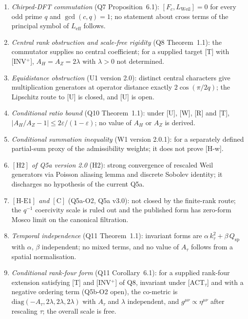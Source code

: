 \documentclass[11pt,a4paper]{article}
\theoremstyle{definition}
\newcommand{\Leff}{L_{\mathrm{eff}}}
\newcommand{\geff}{g^{\mu\nu}}
\newcommand{\Atau}{A_\tau}
\newcommand{\AH}{A_H}
\newcommand{\AZ}{A_Z}
\begin{document}
\begin{enumerate}
        \item \textit{Chirped-DFT commutation} (Q7 Proposition~6.1): $[F_c, L_{\mathrm{Weil}}] = 0$
        for every odd prime $q$ and $\gcd(c, q) = 1$; no statement about cross terms of the
        principal symbol of $\Leff$ follows.

        \item \textit{Central rank obstruction and scale-free rigidity} (Q8 Theorem~1.1): the
        commutator supplies no central coefficient; for a supplied target [T] with [INV$^+$],
        $\AH = \AZ = 2\lambda$ with $\lambda > 0$ not determined.

        \item \textit{Equidistance obstruction} (U1 version 2.0): distinct central characters
        give multiplication generators at operator distance exactly $2\cos(\pi/2q)$; the
        Lipschitz route to [U] is closed, and [U] is open.

        \item \textit{Conditional ratio bound} (Q10 Theorem~1.1): under [U], [W], [R] and [T],
        $|\AH/\AZ - 1| \leq 2\varepsilon/(1 - \varepsilon)$; no value of $\AH$ or $\AZ$ is
        derived.

        \item \textit{Conditional summation inequality} (W1 version 2.0.1): for a separately
        defined partial-sum proxy of the admissibility weights; it does not prove [H-w].

        \item \textit{$[\text{H2}]$ of Q5a version 2.0} (H2): strong convergence of rescaled Weil
        generators via Poisson aliasing lemma and discrete Sobolev identity; it discharges no
        hypothesis of the current Q5a.

        \item \textit{$[\text{H-E1}]$ and $[\text{C}]$} (Q5a-O2, Q5a v3.0): not closed by the
        finite-rank route; the $q^{-1}$ coercivity scale is ruled out and the published form has
        zero-form Mosco limit on the canonical filtration.

        \item \textit{Temporal independence} (Q11 Theorem~1.1): invariant forms are
        $\alpha\,k_\tau^2 + \beta\,Q_{\mathrm{sp}}$ with $\alpha$, $\beta$ independent; no mixed
        terms, and no value of $\Atau$ follows from a spatial normalisation.

        \item \textit{Conditional rank-four form} (Q11 Corollary~6.1): for a supplied rank-four
        extension satisfying [T] and [INV$^+$] of Q8, invariant under [ACT$_\tau$] and with a
        negative ordering term (Q5b-O2 open), the co-metric is
        $\mathrm{diag}(-\Atau, 2\lambda, 2\lambda, 2\lambda)$ with $\Atau$ and $\lambda$
        independent, and $\geff \propto \eta^{\mu\nu}$ after rescaling $\tau$; the overall scale
        is free.
      \end{enumerate}
\end{document}
